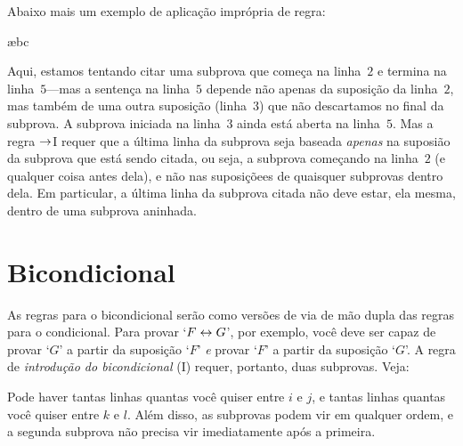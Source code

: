 Abaixo mais um exemplo de aplicação imprópria de regra:
\begin{fitchproof}
\open
	\open
	\ae{bc}
	\close
\close
{}
 
\end{fitchproof}
Aqui, estamos tentando citar uma subprova que começa na linha~$2$ e termina na linha~$5$---mas a sentença na linha~$5$ depende não apenas da suposição da linha~$2$, mas também de uma outra suposição (linha~$3$) que não descartamos no final da subprova.  A subprova iniciada na linha~$3$ ainda está aberta na linha~$5$.  Mas a regra $\rightarrow$I requer que a última linha da subprova seja baseada \emph{apenas} na suposião da subprova  que está sendo citada, ou seja, a subprova começando na linha~$2$ (e qualquer coisa antes dela), e não nas suposiçõees de quaisquer subprovas dentro dela. Em particular, a última linha da subprova citada não deve estar, ela mesma, dentro de uma subprova
aninhada.




\section{Bicondicional}
As regras para o bicondicional serão como versões de via de mão dupla das regras para o condicional. 
Para provar `$F \leftrightarrow G$',  por exemplo, você deve ser capaz de provar `$G$' a partir da  suposição `$F$' \emph{e}  provar `$F$' a partir da suposição `$G$'. A regra de \textit{introdução do bicondicional} ({\eiff}I) requer, portanto, duas subprovas. Veja:  %

 

Pode haver tantas linhas quantas você quiser entre $i$ e $j$, e tantas linhas quantas você quiser entre $k$ e $l$.  Além disso, as subprovas podem vir em qualquer ordem, e a segunda subprova não precisa vir imediatamente após a primeira.

